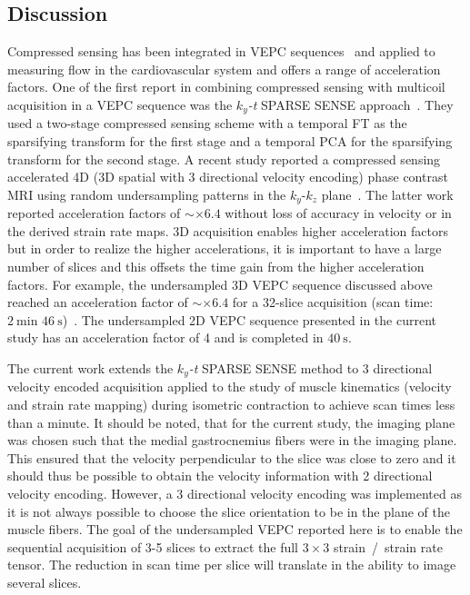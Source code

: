 \subsection{Discussion}
Compressed sensing has been integrated in VEPC sequences~\cite{RNCS9, RNCS10} and applied to measuring flow in the cardiovascular system and offers a range of acceleration factors. 
One of the first report in combining compressed sensing with multicoil acquisition in a VEPC sequence was the $k_y$\textit{-t} SPARSE SENSE approach~\cite{RNCS9, RNCS10}. 
They used a two-stage compressed sensing scheme with a temporal FT as the sparsifying transform for the first stage and a temporal PCA for the sparsifying transform for the second stage. 
A recent study reported a compressed sensing accelerated 4D (3D spatial with 3 directional velocity encoding) phase contrast MRI using random undersampling patterns in the $k_y$-$k_z$ plane~\cite{RNCS11}.
The latter work reported acceleration factors of $\sim \times 6.4$ without loss of accuracy in velocity or in the derived strain rate maps. 
3D acquisition enables higher acceleration factors but in order to realize the higher accelerations, it is important to have a large number of slices and this offsets the time gain from the higher acceleration factors. 
For example, the undersampled 3D VEPC sequence discussed above reached an acceleration factor of $\sim \times 6.4$ for a 32-slice acquisition (scan time: $\SI{2}{\minute}$ $\SI{46}{\second}$)~\cite{RNCS11}. 
The undersampled 2D VEPC sequence presented in the current study has an acceleration factor of 4 and is completed in $\SI{40}{\second}$.

The current work extends the $k_y$\textit{-t} SPARSE SENSE method to 3 directional velocity encoded acquisition applied to the study of muscle kinematics (velocity and strain rate mapping) during isometric contraction to achieve scan times less than a minute. 
It should be noted, that for the current study, the imaging plane was chosen such that the medial gastrocnemius fibers were in the imaging plane. 
This ensured that the velocity perpendicular to the slice was close to zero and it should thus be possible to obtain the velocity information with 2 directional velocity encoding. 
However, a 3 directional velocity encoding was implemented as it is not always possible to choose the slice orientation to be in the plane of the muscle fibers.
The goal of the undersampled VEPC reported here is to enable the sequential acquisition of 3-5 slices to extract the full $3 \times 3$ strain~/~strain rate tensor. 
The reduction in scan time per slice will translate in the ability to image several slices. 


